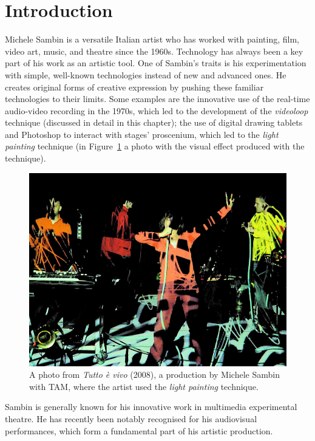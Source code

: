 \section{Introduction}
Michele Sambin is a versatile Italian artist who has worked with painting, film, video art, music, and theatre since the 1960s. Technology has always been a key part of his work as an artistic tool. One of Sambin's traits is his experimentation with simple, well-known technologies instead of new and advanced ones. He creates original forms of creative expression by pushing these familiar technologies to their limits. Some examples are the innovative use of the real-time audio-video recording in the 1970s, which led to the development of the \textit{videoloop} technique (discussed in detail in this chapter); the use of digital drawing tablets and Photoshop to interact with stages’ proscenium, which led to the \textit{light painting} technique (in Figure~\ref{fig:aa-light_painting} a photo with the visual effect produced with the technique).\\
\begin{figure}[!h]
    \centering
    \includegraphics[width=\linewidth]{chapters/appendix/a/image/figa-lightpainting.jpg}
    \caption{A photo from \textit{Tutto è vivo} (2008), a production by Michele Sambin with TAM, where the artist used the \textit{light painting} technique.}
    \label{fig:aa-light_painting}
\end{figure}
Sambin is generally known for his innovative work in multimedia experimental theatre. He has recently been notably recognised for his audiovisual performances, which form a fundamental part of his artistic production.\\
